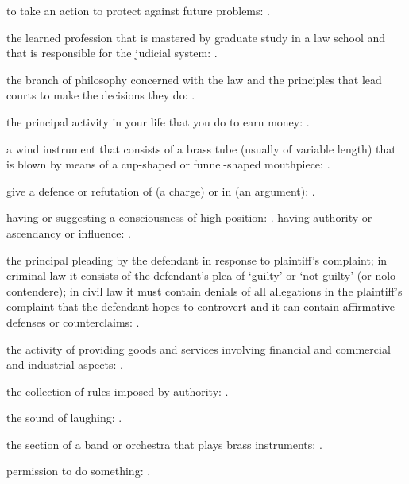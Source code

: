   to take an action to protect against future problems: .

  the learned profession that is mastered by graduate study in a law school and that is responsible for the judicial system:   .

  the branch of philosophy concerned with the law and the principles that lead courts to make the decisions they do:   .

  the principal activity in your life that you do to earn money:   .

  a wind instrument that consists of a brass tube (usually of variable length) that is blown by means of a cup-shaped or funnel-shaped mouthpiece:   .

  give a defence or refutation of (a charge) or in (an argument): .

  having or suggesting a consciousness of high position: . having authority or ascendancy or influence:   .

  the principal pleading by the defendant in response to plaintiff's complaint; in criminal law it consists of the defendant's plea of `guilty' or `not guilty' (or nolo contendere); in civil law it must contain denials of all allegations in the plaintiff's complaint that the defendant hopes to controvert and it can contain affirmative defenses or counterclaims: .

  the activity of providing goods and services involving financial and commercial and industrial aspects:   .

  the collection of rules imposed by authority:   .

  the sound of laughing:   .

  the section of a band or orchestra that plays brass instruments:   .

  permission to do something: .

